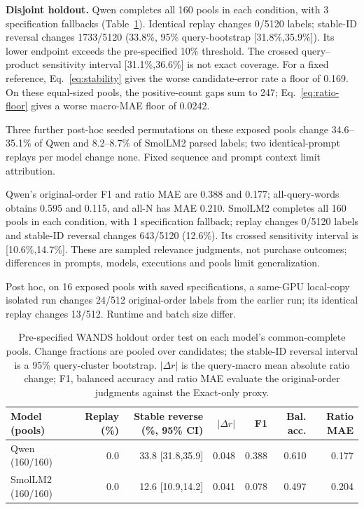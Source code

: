 \documentclass[conference]{IEEEtran}
\begin{document}
\textbf{Disjoint holdout.}
Qwen completes all 160 pools in each condition, with 3 specification fallbacks (Table~\ref{tab:holdout}). Identical replay changes 0/5120 labels; stable-ID reversal changes 1733/5120 (33.8\%, 95\% query-bootstrap [31.8\%,35.9\%]). Its lower endpoint exceeds the pre-specified 10\% threshold. The crossed query--product sensitivity interval [31.1\%,36.6\%] is not exact coverage. For a fixed reference, Eq.~\eqref{eq:stability} gives the worse candidate-error rate a floor of 0.169. On these equal-sized pools, the positive-count gaps sum to 247; Eq.~\eqref{eq:ratio-floor} gives a worse macro-MAE floor of 0.0242.

Three further post-hoc seeded permutations on these exposed pools change 34.6--35.1\% of Qwen and 8.2--8.7\% of SmolLM2 parsed labels; two identical-prompt replays per model change none. Fixed sequence and prompt context limit attribution.

Qwen's original-order F1 and ratio MAE are 0.388 and 0.177; all-query-words obtains 0.595 and 0.115, and all-N has MAE 0.210. SmolLM2 completes all 160 pools in each condition, with 1 specification fallback; replay changes 0/5120 labels and stable-ID reversal changes 643/5120 (12.6\%). Its crossed sensitivity interval is [10.6\%,14.7\%]. These are sampled relevance judgments, not purchase outcomes; differences in prompts, models, executions and pools limit generalization.

Post hoc, on 16 exposed pools with saved specifications, a same-GPU local-copy isolated run changes 24/512 original-order labels from the earlier run; its identical replay changes 13/512. Runtime and batch size differ.

\begin{table}[t]
\caption{Pre-specified WANDS holdout order test on each model's common-complete pools. Change fractions are pooled over candidates; the stable-ID reversal interval is a 95\% query-cluster bootstrap. $|\Delta r|$ is the query-macro mean absolute ratio change; F1, balanced accuracy and ratio MAE evaluate the original-order judgments against the Exact-only proxy.}
\label{tab:holdout}
\centering\small
\begin{tabular}{lrrrrrr}
\toprule
Model (pools) & Replay (\%) & Stable reverse (\%, 95\% CI) & $|\Delta r|$ & F1 & Bal. acc. & Ratio MAE \\
\midrule
Qwen (160/160) & 0.0 & 33.8 [31.8,35.9] & 0.048 & 0.388 & 0.610 & 0.177 \\
SmolLM2 (160/160) & 0.0 & 12.6 [10.9,14.2] & 0.041 & 0.078 & 0.497 & 0.204 \\
\bottomrule
\end{tabular}
\end{table}
\end{document}
